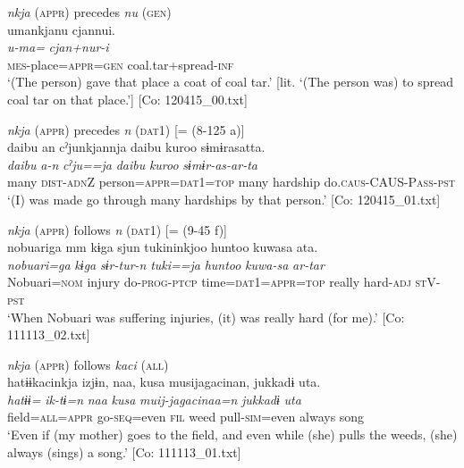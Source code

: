   \ex  \textit{nkja} (\textsc{appr}) precedes \textit{nu} (\textsc{gen})\\

      \glll    umankjanu  cjannui.\\
      \textit{u-ma=}  \textit{cjan+nur-i}\\
      \textsc{mes}-place=\textsc{appr}=\textsc{gen}  coal.tar+spread-\textsc{inf}\\
    \glt   ‘(The person) gave that place a coat of coal tar.’ [lit. ‘(The person was) to spread coal tar on that place.’]      [Co: 120415\_00.txt]

  \ex  \textit{nkja} (\textsc{appr}) precedes \textit{n} (\textsc{dat}1) [= (8-125 a)]\\
      \glll    {\textbar}daibu{\textbar}  an  cˀjunkjannja  {\textbar}daibu  kuroo{\textbar}  sɨmɨrasatta.\\
      \textit{daibu}  \textit{a-n}  \textit{cˀju==ja}  \textit{daibu}  \textit{kuroo} \textit{sɨmɨr-as-ar-ta}\\
      many  \textsc{dist}-\textsc{adn}Z  person=\textsc{appr}=\textsc{dat}1=\textsc{top}  many  hardship   do.\textsc{caus}-CAUS-P\textsc{ass}-\textsc{pst}\\
      \glt       ‘(I) was made go through many hardships by that person.’ [Co: 120415\_01.txt]

  \ex \textit{nkja} (\textsc{appr}) follows \textit{n} (\textsc{dat}1) [= (9-45 f)]\\
      \glll    nobuariga  mm  kɨga  sjun  tukininkjoo  huntoo  kuwasa  ata.\\
      \textit{nobuari=ga}    \textit{kɨga}  \textit{sɨr-tur-n}  \textit{tuki==ja}  \textit{huntoo}  \textit{kuwa-sa}  \textit{ar-tar}\\
      Nobuari=\textsc{nom}    injury  do-\textsc{prog}-\textsc{ptcp}  time=\textsc{dat}1=\textsc{appr}=\textsc{top}  really  hard-\textsc{adj}  \textsc{st}V-\textsc{pst}\\
      \glt       ‘When Nobuari was suffering injuries, (it) was really hard (for me).’ [Co: 111113\_02.txt]

   \ex  \textit{nkja} (\textsc{appr}) follows \textit{kaci} (\textsc{all})\\
      \glll    hatɨɨkacinkja  izjɨn,  naa,  kusa  musijagacinan,  jukkadɨ  uta.      \\
      \textit{hatɨɨ=}  \textit{ik-tɨ=n}  \textit{naa}  \textit{kusa}  \textit{muij-jagacinaa=n}  \textit{jukkadɨ}  \textit{uta}      \\
      field=\textsc{all}=\textsc{appr}  go-\textsc{seq}=even  \textsc{fil}  weed  pull-\textsc{sim}=even  always  song\\
      \glt       ‘Even if (my mother) goes to the field, and even while (she) pulls the weeds, (she) always (sings) a song.’ [Co: 111113\_01.txt]

